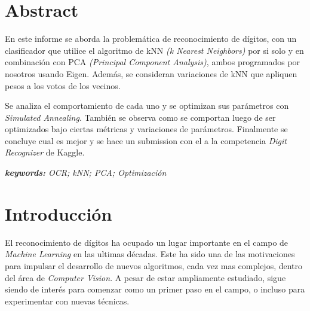\documentclass[a4paper]{article}
\begin{document}
\thispagestyle{empty}

\maketitle
\newpage

\thispagestyle{empty}
\tableofcontents


\section{Abstract}

En este informe se aborda la problemática de reconocimiento de dígitos, con un clasificador que utilice el algoritmo de kNN \textit{(k Nearest Neighbors)} por si solo y en combinación con PCA \textit{(Principal Component Analysis)}, ambos programados por nosotros usando Eigen. Además, se consideran variaciones de kNN que apliquen pesos a los votos de los vecinos.

Se analiza el comportamiento de cada uno y se optimizan sus parámetros con \textit{Simulated Annealing}. También se observa como se comportan luego de ser optimizados bajo ciertas métricas y variaciones de parámetros. Finalmente se concluye cual es mejor y se hace un submission con el a la competencia \textit{Digit Recognizer} de Kaggle.

\textit{\textbf{keywords:} OCR; kNN; PCA; Optimización}

\section{Introducción}

El reconocimiento de dígitos ha ocupado un lugar importante en el campo de \textit{Machine Learning} en las ultimas décadas. Este ha sido una de las motivaciones para impulsar el desarrollo de nuevos algoritmos, cada vez mas complejos, dentro del área de \textit{Computer Vision}. A pesar de estar ampliamente estudiado, sigue siendo de interés para comenzar como un primer paso en el campo, o incluso para experimentar con nuevas técnicas.
\end{document}
